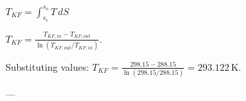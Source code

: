 \( T_{KF} = \int_{s_e}^{s_o} T \, dS \)  

\( T_{KF} = \frac{T_{KF,in} - T_{KF,out}}{\ln(T_{KF,out} / T_{KF,in})} \).  

Substituting values:  
\( T_{KF} = \frac{298.15 - 288.15}{\ln(298.15 / 288.15)} = 293.122 \, \text{K} \).  

---